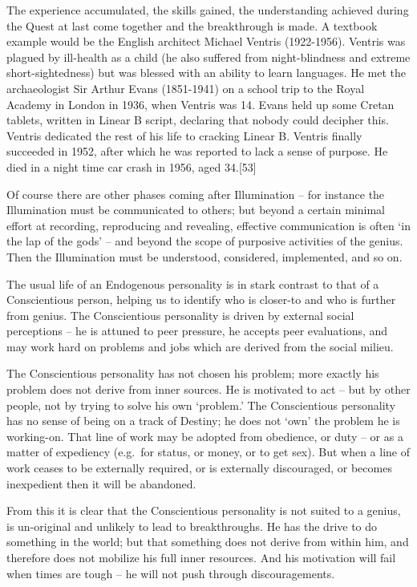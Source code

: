 \documentclass[
]{book}
\begin{document}
The experience accumulated, the skills gained, the understanding achieved during the Quest at last come together and the breakthrough is made. A textbook example would be the English architect Michael Ventris (1922-1956). Ventris was plagued by ill-health as a child (he also suffered from night-blindness and extreme short-sightedness) but was blessed with an ability to learn languages. He met the archaeologist Sir Arthur Evans (1851-1941) on a school trip to the Royal Academy in London in 1936, when Ventris was 14. Evans held up some Cretan tablets, written in Linear B script, declaring that nobody could decipher this. Ventris dedicated the rest of his life to cracking Linear B. Ventris finally succeeded in 1952, after which he was reported to lack a sense of purpose. He died in a night time car crash in 1956, aged 34.{[}53{]}

Of course there are other phases coming after Illumination -- for instance the Illumination must be communicated to others; but beyond a certain minimal effort at recording, reproducing and revealing, effective communication is often `in the lap of the gods' -- and beyond the scope of purposive activities of the genius. Then the Illumination must be understood, considered, implemented, and so on.

The usual life of an Endogenous personality is in stark contrast to that of a Conscientious person, helping us to identify who is closer-to and who is further from genius. The Conscientious personality is driven by external social perceptions -- he is attuned to peer pressure, he accepts peer evaluations, and may work hard on problems and jobs which are derived from the social milieu.

The Conscientious personality has not chosen his problem; more exactly his problem does not derive from inner sources. He is motivated to act -- but by other people, not by trying to solve his own `problem.' The Conscientious personality has no sense of being on a track of Destiny; he does not `own' the problem he is working-on. That line of work may be adopted from obedience, or duty -- or as a matter of expediency (e.g.~for status, or money, or to get sex). But when a line of work ceases to be externally required, or is externally discouraged, or becomes inexpedient then it will be abandoned.

From this it is clear that the Conscientious personality is not suited to a genius, is un-original and unlikely to lead to breakthroughs. He has the drive to do something in the world; but that something does not derive from within him, and therefore does not mobilize his full inner resources. And his motivation will fail when times are tough -- he will not push through discouragements.
\end{document}
